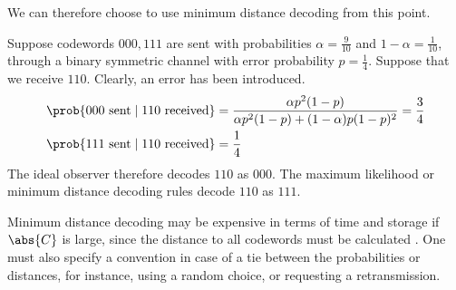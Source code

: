 We can therefore choose to use minimum distance decoding from this point.
\begin{example}
    Suppose codewords $000, 111$ are sent with probabilities $\alpha = \frac{9}{10}$ and $1 - \alpha = \frac{1}{10}$, through a binary symmetric channel with error probability $p = \frac{1}{4}$.
    Suppose that we receive $110$.
    Clearly, an error has been introduced.
    \begin{align*}
        \prob{000 \text{ sent} \mid 110 \text{ received}} &= \frac{\alpha p^2 (1-p)}{\alpha p^2 (1-p) + (1-\alpha)p(1-p)^2} = \frac{3}{4} \\
        \prob{111 \text{ sent} \mid 110 \text{ received}} &= \frac{1}{4}
    \end{align*}
    The ideal observer therefore decodes $110$ as $000$.
    The maximum likelihood or minimum distance decoding rules decode $110$ as $111$.
\end{example}
\begin{remark}
    Minimum distance decoding may be expensive in terms of time and storage if $\abs{C}$ is large, since the distance to all codewords must be calculated .
    One must also specify a convention in case of a tie between the probabilities or distances, for instance, using a random choice, or requesting a retransmission.
\end{remark}

